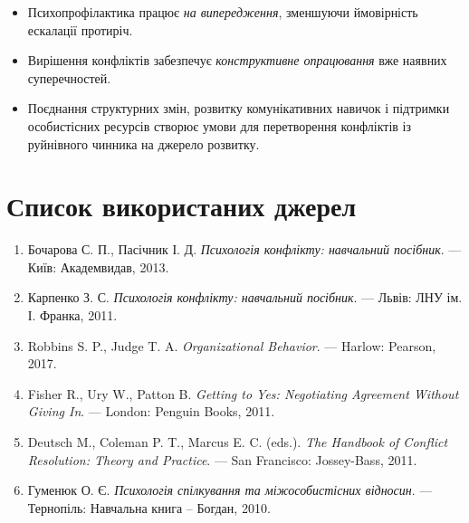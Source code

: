 \documentclass[12pt,a4paper]{article}
\begin{document}
    \begin{itemize}
        \item Психопрофілактика працює \textit{на випередження}, зменшуючи ймовірність ескалації протиріч.
        \item Вирішення конфліктів забезпечує \textit{конструктивне опрацювання} вже наявних суперечностей.
        \item Поєднання структурних змін, розвитку комунікативних навичок і підтримки особистісних ресурсів 
        створює умови для перетворення конфліктів із руйнівного чинника на джерело розвитку.
    \end{itemize}

    \section*{Список використаних джерел}
    \begin{enumerate}
        \item Бочарова С. П., Пасічник І. Д. \textit{Психологія конфлікту: навчальний посібник}. --- Київ: Академвидав, 2013.
        \item Карпенко З. С. \textit{Психологія конфлікту: навчальний посібник}. --- Львів: ЛНУ ім. І. Франка, 2011.
        \item Robbins S. P., Judge T. A. \textit{Organizational Behavior}. --- Harlow: Pearson, 2017.
        \item Fisher R., Ury W., Patton B. \textit{Getting to Yes: Negotiating Agreement Without Giving In}. --- London: Penguin Books, 2011.
        \item Deutsch M., Coleman P. T., Marcus E. C. (eds.). \textit{The Handbook of Conflict Resolution: Theory and Practice}. --- San Francisco: Jossey-Bass, 2011.
        \item Гуменюк О. Є. \textit{Психологія спілкування та міжособистісних відносин}. --- Тернопіль: Навчальна книга – Богдан, 2010.
    \end{enumerate}
\end{document}
